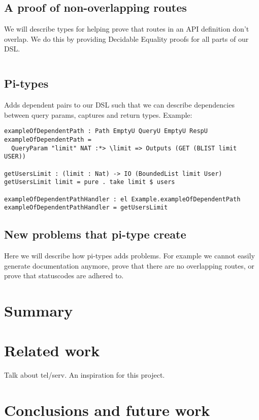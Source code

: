 \documentclass[12pt,a4paper]{article}
\begin{document}
\subsection{A proof of non-overlapping routes}
We will describe types for helping prove that routes in an API definition don't overlap.  We do this
by providing Decidable Equality proofs for all parts of our DSL.
\begin{verbatim}

\end{verbatim}
\subsection{Pi-types}
Adds dependent pairs to our DSL such that we can describe dependencies between query params, captures and return types.  Example:

\begin{verbatim}
exampleOfDependentPath : Path EmptyU QueryU EmptyU RespU
exampleOfDependentPath =
  QueryParam "limit" NAT :*> \limit => Outputs (GET (BLIST limit USER))

getUsersLimit : (limit : Nat) -> IO (BoundedList limit User)
getUsersLimit limit = pure . take limit $ users

exampleOfDependentPathHandler : el Example.exampleOfDependentPath
exampleOfDependentPathHandler = getUsersLimit

\end{verbatim}
\subsection{New problems that pi-type create}
Here we will describe how pi-types adds problems. For example we cannot easily generate documentation anymore, prove that there are no overlapping routes, or prove that statuscodes are adhered to.

\section{Summary}
\section{Related work}
Talk about tel/serv. An inspiration for this project.
\section{Conclusions and future work}



\end{document}
